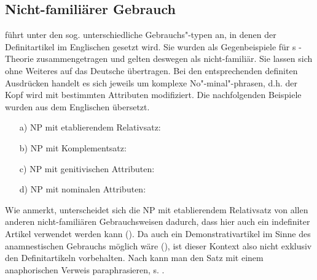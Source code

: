 \subsection{Nicht-familiärer Gebrauch}\label{sec:nicht-fam}

\textcite[130--149]{Hawkins1978} führt unter den sog.  unterschiedliche Gebrauchs"-typen an, in denen der Definitartikel im Englischen gesetzt wird. Sie wurden als Gegenbeispiele für \citeauthor{Christophersen1939}s -Theorie zusammengetragen und gelten deswegen als nicht-familiär. Sie lassen sich ohne Weiteres auf das Deutsche übertragen. Bei den entsprechenden definiten Ausdrücken handelt es sich jeweils um komplexe No"-minal"-phrasen, d.h. der Kopf wird mit bestimmten Attributen modifiziert. Die nachfolgenden Beispiele \parencite[vgl. die Übersicht in][37]{Himmelmann1997} wurden aus dem Englischen übersetzt.
 
\begin{itemize} 
		\item[a)] \label{etab} NP mit etablierendem Relativsatz: \\  
		\item[b)] \label{komp} NP mit Komplementsatz: \\  
		\item[c)] \label{gen-attr} NP mit genitivischen Attributen: \\ 
		\item[d)] \label{n-attr} NP mit nominalen Attributen: \\ 
\end{itemize}

Wie \textcite[38]{Himmelmann1997} anmerkt, unterscheidet sich die NP mit etablierendem Relativsatz von allen anderen nicht-familiären Gebrauchsweisen dadurch, dass hier auch ein indefiniter Artikel verwendet werden kann (). Da auch ein Demonstrativartikel im Sinne des anamnestischen Gebrauchs möglich wäre (), ist dieser Kontext also nicht exklusiv den Definitartikeln vorbehalten. Nach \textcite[308]{Lobner1985} kann man den Satz mit einem anaphorischen Verweis paraphrasieren, s. . %

